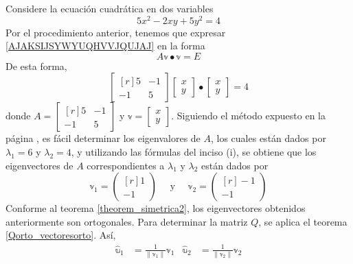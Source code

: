 \begin{example}
    Considere la ecuación cuadrática en dos variables
    \begin{equation}
        5x^2 - 2xy + 5y^2 = 4 \label{AJAKSIJSYWYUQHVVJQUJAJ}
    \end{equation}
    Por el procedimiento anterior, tenemos que expresar \eqref{AJAKSIJSYWYUQHVVJQUJAJ} en la forma
    \begin{equation}
        A\mathbb{v} \bullet \mathbb{v} = E \label{IAJAJAJAJAHAHHHJQJ}
    \end{equation}
    De esta forma,
    $$\begin{bmatrix*}[r] 5 & -1 \\ -1 & 5 \end{bmatrix*} \begin{bmatrix} x \\ y \end{bmatrix} \bullet \begin{bmatrix} x \\ y \end{bmatrix} = 4$$
    donde $A = \begin{bmatrix*}[r] 5 & -1 \\ -1 & 5 \end{bmatrix*}$ y $\mathbb{v} = \begin{bmatrix} x \\ y \end{bmatrix}$. Siguiendo el método expuesto en la página \pageref{metodo_eigen_2x2}, es fácil determinar los eigenvalores de $A$, los cuales están dados por $\lambda_1 = 6$ y $\lambda_2 = 4$, y utilizando las fórmulas del inciso (i), se obtiene que los eigenvectores de $A$ correspondientes a $\lambda_1$ y $\lambda_2$ están dados por
    $$\mathbb{v}_1 = \begin{pmatrix*}[r] 1 \\ -1 \end{pmatrix*} \quad \text{ y } \quad \mathbb{v}_2 = \begin{pmatrix*}[r] -1 \\ -1 \end{pmatrix*}$$\newpage\noindent
    Conforme al teorema \ref{theorem_simetrica2}, los eigenvectores obtenidos anteriormente son ortogonales. Para determinar la matriz $Q$, se aplica el teorema \ref{Qorto_vectoresorto}. Así,
    \begin{align*}
        \hat{\mathbb{u}}_1 & = \frac{1}{\| \mathbb{v}_1 \|} \mathbb{v}_1 & \hat{\mathbb{u}}_2 & = \frac{1}{\| \mathbb{v}_2 \|} \mathbb{v}_2 \\

\end{align*}
\end{example}
